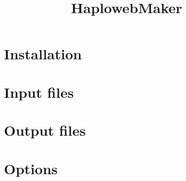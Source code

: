 \documentclass{article}
\begin{document}
\title{HaplowebMaker}
\maketitle
\newpage

\section{Installation}

\par{

}

\section{Input files}
\section{Output files}
\section{Options}
\end{document}

